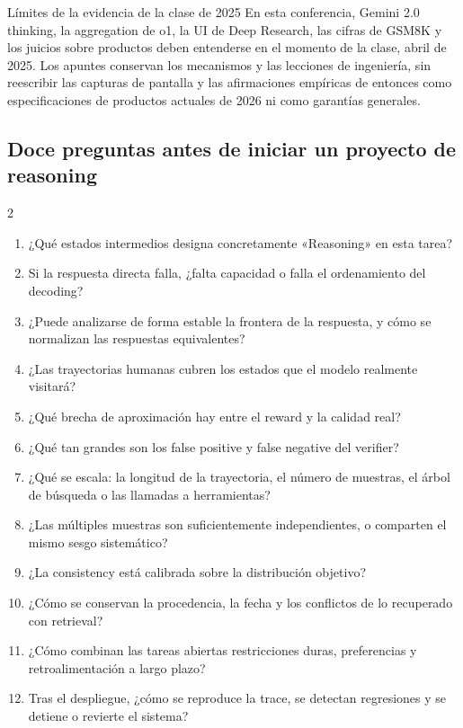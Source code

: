 \begin{warningbox}{Límites de la evidencia de la clase de 2025}
En esta conferencia, Gemini 2.0 thinking, la aggregation de o1, la UI de Deep Research, las cifras de GSM8K y los juicios sobre productos deben entenderse en el momento de la clase, abril de 2025. Los apuntes conservan los mecanismos y las lecciones de ingeniería, sin reescribir las capturas de pantalla y las afirmaciones empíricas de entonces como especificaciones de productos actuales de 2026 ni como garantías generales.
\end{warningbox}

\subsection{Doce preguntas antes de iniciar un proyecto de reasoning}

\small
\begin{multicols}{2}
\begin{enumerate}
  \item ¿Qué estados intermedios designa concretamente «Reasoning» en esta tarea?
  \item Si la respuesta directa falla, ¿falta capacidad o falla el ordenamiento del decoding?
  \item ¿Puede analizarse de forma estable la frontera de la respuesta, y cómo se normalizan las respuestas equivalentes?
  \item ¿Las trayectorias humanas cubren los estados que el modelo realmente visitará?
  \item ¿Qué brecha de aproximación hay entre el reward y la calidad real?
  \item ¿Qué tan grandes son los false positive y false negative del verifier?
  \item ¿Qué se escala: la longitud de la trayectoria, el número de muestras, el árbol de búsqueda o las llamadas a herramientas?
  \item ¿Las múltiples muestras son suficientemente independientes, o comparten el mismo sesgo sistemático?
  \item ¿La consistency está calibrada sobre la distribución objetivo?
  \item ¿Cómo se conservan la procedencia, la fecha y los conflictos de lo recuperado con retrieval?
  \item ¿Cómo combinan las tareas abiertas restricciones duras, preferencias y retroalimentación a largo plazo?
  \item Tras el despliegue, ¿cómo se reproduce la trace, se detectan regresiones y se detiene o revierte el sistema?
\end{enumerate}
\end{multicols}
\normalsize

